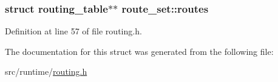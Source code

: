 \hypertarget{structroute__set_a423016a014c4eb12726597161ec0b6f9}{
\subsubsection[{routes}]{\setlength{\rightskip}{0pt plus 5cm}struct {\bf routing\-\_\-table}$\ast$$\ast$ route\-\_\-set\-::routes}}\label{structroute__set_a423016a014c4eb12726597161ec0b6f9}


Definition at line 57 of file routing.\-h.



The documentation for this struct was generated from the following file\-:\begin{DoxyCompactItemize}
\item 
src/runtime/\hyperlink{routing_8h}{routing.\-h}\end{DoxyCompactItemize}
